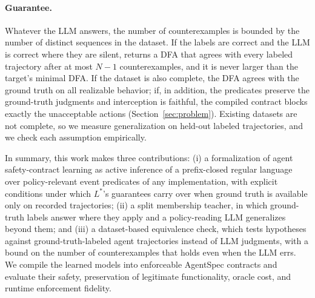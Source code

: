 \paragraph{Guarantee.}
Whatever the LLM answers, the number of counterexamples is bounded by the number of distinct sequences in the dataset. If the labels are correct and the LLM is correct where they are silent, \system returns a DFA that agrees with every labeled trajectory after at most $N-1$ counterexamples, and it is never larger than the target's minimal DFA. If the dataset is also complete, the DFA agrees with the ground truth on all realizable behavior; if, in addition, the predicates preserve the ground-truth judgments and interception is faithful, the compiled contract blocks exactly the unacceptable actions (Section~\ref{sec:problem}). Existing datasets are not complete, so we measure generalization on held-out labeled trajectories, and we check each assumption empirically.

In summary, this work makes three contributions: (i) a formalization of agent safety-contract learning as active inference of a prefix-closed regular language over policy-relevant event predicates of any implementation, with explicit conditions under which $L^*$'s guarantees carry over when ground truth is available only on recorded trajectories; (ii) a split membership teacher, in which ground-truth labels answer where they apply and a policy-reading LLM generalizes beyond them; and (iii) a dataset-based equivalence check, which tests hypotheses against ground-truth-labeled agent trajectories instead of LLM judgments, with a bound on the number of counterexamples that holds even when the LLM errs. We compile the learned models into enforceable AgentSpec contracts and evaluate their safety, preservation of legitimate functionality, oracle cost, and runtime enforcement fidelity.
